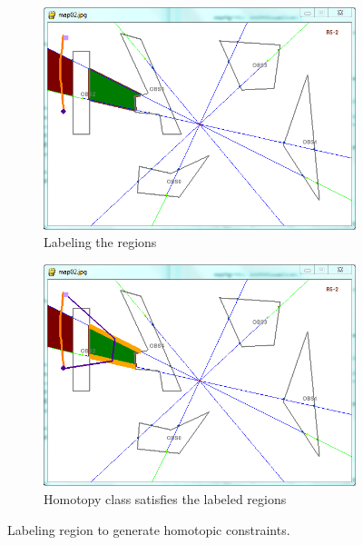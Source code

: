 \documentclass[letterpaper, 10 pt, conference]{ieeeconf}
\begin{document}
\begin{figure}
	\centering
	\begin{subfigure}[t]{0.47\linewidth}
		\centering
		\includegraphics[width=\textwidth]{fig/regionlabel1.png}
		\caption{Labeling the regions}
		\label{fig:region_label:label}
	\end{subfigure}  
	\begin{subfigure}[t]{0.47\linewidth}
		\centering
		\includegraphics[width=\textwidth]{fig/regionlabelhomo1.png}
		\caption{Homotopy class satisfies the labeled regions}
		\label{fig:region_label:constraint}
	\end{subfigure}   
	\caption{Labeling region to generate homotopic constraints.}
	\label{fig:region_label}
\end{figure}
\end{document}
